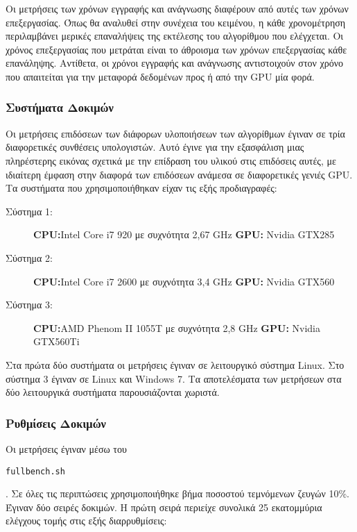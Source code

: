 Οι μετρήσεις των χρόνων εγγραφής και ανάγνωσης διαφέρουν από αυτές των χρόνων επεξεργασίας. Όπως θα αναλυθεί στην συνέχεια του κειμένου, η κάθε χρονομέτρηση περιλαμβάνει μερικές επαναλήψεις της εκτέλεσης του αλγορίθμου που ελέγχεται. Οι χρόνος επεξεργασίας που μετράται είναι το άθροισμα των χρόνων επεξεργασίας κάθε επανάληψης. Αντίθετα, οι χρόνοι εγγραφής και ανάγνωσης αντιστοιχούν στον χρόνο που απαιτείται για την μεταφορά δεδομένων προς ή από την GPU μία φορά.   

\subsubsection*{Συστήματα Δοκιμών}

Οι μετρήσεις επιδόσεων των διάφορων υλοποιήσεων των αλγορίθμων έγιναν σε τρία διαφορετικές συνθέσεις υπολογιστών. Αυτό έγινε για την εξασφάλιση μιας πληρέστερης εικόνας σχετικά με την επίδραση του υλικού στις επιδόσεις αυτές, με ιδιαίτερη έμφαση στην διαφορά των επιδόσεων ανάμεσα σε διαφορετικές γενιές GPU. Τα συστήματα που χρησιμοποιήθηκαν είχαν τις εξής προδιαγραφές:

\begin{description}
  \item[Σύστημα 1:]\textbf{CPU:}Intel Core i7 920 με συχνότητα 2,67 GHz \textbf{GPU:} Nvidia GTX285 %
  \item[Σύστημα 2:]\textbf{CPU:}Intel Core i7 2600 με συχνότητα 3,4 GHz \textbf{GPU:} Nvidia GTX560 %
  \item[Σύστημα 3:]\textbf{CPU:}AMD Phenom II 1055T με συχνότητα 2,8 GHz \textbf{GPU:} Nvidia GTX560Ti %
\end{description}

Στα πρώτα δύο συστήματα οι μετρήσεις έγιναν σε λειτουργικό σύστημα Linux. Στο σύστημα 3 έγιναν σε Linux και Windows 7. Τα αποτελέσματα των μετρήσεων στα δύο λειτουργικά συστήματα παρουσιάζονται χωριστά.

\subsubsection*{Ρυθμίσεις Δοκιμών}

Οι μετρήσεις έγιναν μέσω του \begin{english}\verb!fullbench.sh!\end{english}. Σε όλες τις περιπτώσεις χρησιμοποιήθηκε βήμα ποσοστού τεμνόμενων ζευγών 10\%. Έγιναν δύο σειρές δοκιμών. Η πρώτη σειρά περιείχε συνολικά 25 εκατομμύρια ελέγχους τομής στις εξής διαρρυθμίσεις:

